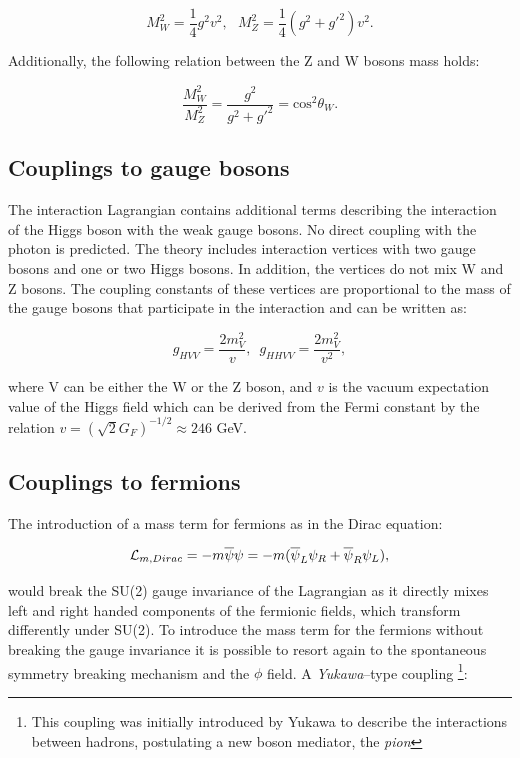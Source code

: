 \begin{equation}
M^2_W=\frac{1}{4}g^2v^2, \, \, \, \, M^2_Z=\frac{1}{4}(g^2+g'^2)v^2.
\end{equation}

Additionally, the following relation between the Z and W bosons mass holds:

\begin{equation}
\frac{M_W^2}{M_Z^2}=\frac{g^2}{g^2+g'^2}=\operatorname{cos^2}\theta_W.
\end{equation}

\subsection{Couplings to gauge bosons}

The interaction Lagrangian contains additional terms describing the interaction of the Higgs boson with the weak gauge bosons. No direct coupling with the photon is predicted. The theory includes interaction vertices with two gauge bosons and one or two Higgs bosons. In addition, the vertices do not mix W and Z bosons. The coupling constants of these vertices are proportional to the mass of the gauge bosons that participate in the interaction and can be written as:

\begin{equation}
g_{HVV}=\frac{2m^2_V}{v}, \,\,\,   g_{HHVV}=\frac{2m^2_V}{v^2},
\end{equation}

where V can be either the W or the Z boson, and $v$ is the vacuum expectation value of the Higgs field which can be derived from the Fermi constant by the relation $v = (\sqrt{2}G_F)^{-1/2} \approx 246$ GeV.

\subsection{Couplings to fermions}

The introduction of a mass term for fermions as in the Dirac equation: 

\begin{equation}
\mathcal{L}_{m,Dirac}= -m\overline{\psi}\psi=-m(\overline{\psi}_L\psi_R+\overline{\psi}_R\psi_L),
\end{equation}

would break the SU(2) gauge invariance of the Lagrangian as it directly mixes left and right handed components of the fermionic fields, which transform differently under SU(2). To introduce the mass term for the fermions without breaking the gauge invariance it is possible to resort again to the spontaneous symmetry breaking mechanism and the $\phi$ field. A \emph{Yukawa}--type coupling
\footnote{This coupling was initially introduced by Yukawa \cite{Yukawa:1935xg} to describe the interactions between hadrons, postulating a new boson mediator, the \emph{pion}}:

